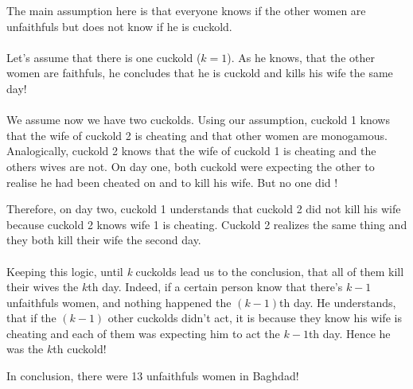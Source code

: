 The main assumption here is that everyone knows if the other women are unfaithfuls but does not know if he is cuckold.

\paragraph{}Let's assume that there is one cuckold ($k = 1$). As he knows, that the other women are faithfuls, he concludes that he is cuckold and kills his wife the same day! 

\paragraph{}We assume now we have two cuckolds.
Using our assumption, cuckold 1 knows that the wife of cuckold 2 is cheating and that other women are monogamous. Analogically, cuckold 2 knows that the wife of cuckold 1 is cheating and the others wives are not. On day one, both cuckold were expecting the other to realise he had been cheated on and to kill his wife. But no one did ! 

Therefore, on day two, cuckold 1 understands that cuckold 2 did not kill his wife because cuckold 2 knows wife 1 is cheating. Cuckold 2 realizes the same thing and they both kill their wife the second day.  

\paragraph{}Keeping this logic, until \textit{k} cuckolds lead us to the conclusion, that all of them kill their wives the $k$th day. Indeed, if a certain person know that there's $k - 1$ unfaithfuls women, and nothing happened the $(k-1)$th day. He understands, that if the $(k-1)$ other cuckolds didn't act, it is because they know his wife is cheating and each of them was expecting him to act the $k-1$th day. Hence he was the $k$th cuckold!

In conclusion, there were 13 unfaithfuls women in Baghdad! 
